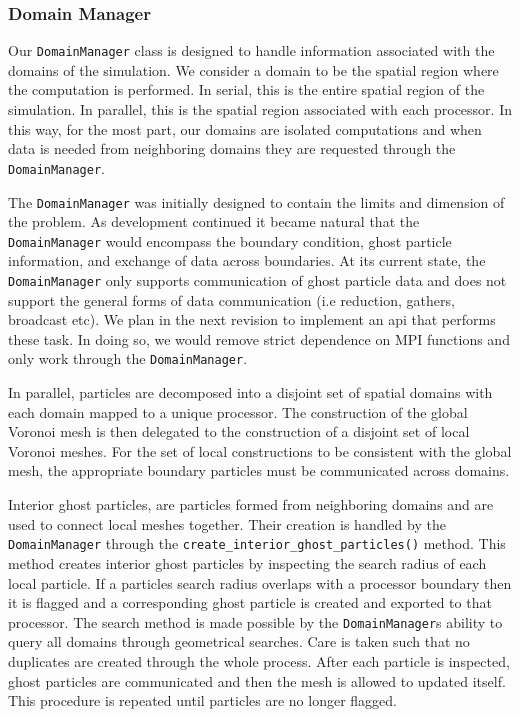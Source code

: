 \subsubsection{Domain Manager}
Our \lstinline{DomainManager} class is designed to handle information associated with
the domains of the simulation. We consider a domain to be the spatial region where the computation
is performed. In serial, this is the entire spatial region of the simulation.
In parallel, this is the spatial region associated with each processor. 
In this way, for the most part, our domains are isolated computations and when
data is needed from neighboring domains they are requested through the \lstinline{DomainManager}.

The \lstinline{DomainManager} was initially designed to contain the limits and dimension of
the problem. As development continued it became natural that the \lstinline{DomainManager} would
encompass the boundary condition, ghost particle information, and exchange of data across boundaries.
At its current state, the \lstinline{DomainManager} only supports communication of ghost particle data
and does not support the general forms of data communication
(i.e reduction, gathers, broadcast etc). We plan in the next revision to implement an api that
performs these task. In doing so, we would remove strict dependence on MPI functions and only
work through the \lstinline{DomainManager}.

In parallel, particles are decomposed into a disjoint set of spatial domains
with each domain mapped to a unique processor. The construction
of the global Voronoi mesh is then delegated to the construction of a disjoint set
of local Voronoi meshes. For the set of local constructions to be consistent
with the global mesh, the appropriate boundary particles must be 
communicated across domains.

Interior ghost particles, are particles formed from neighboring domains and are used to
connect local meshes together. Their creation is handled by the \lstinline{DomainManager}
through the \lstinline{create_interior_ghost_particles()} method. This method
creates interior ghost particles by inspecting the search radius of
each local particle. If a particles search radius overlaps with a processor
boundary then it is flagged and a corresponding ghost particle is created and exported to that processor.
The search method is made possible by the \lstinline{DomainManager}s ability to query
all domains through geometrical searches. Care is taken such that no duplicates are created through the 
whole process. After each particle is inspected, ghost particles are communicated and then the
mesh is allowed to updated itself. This procedure is repeated until particles are no longer flagged.

